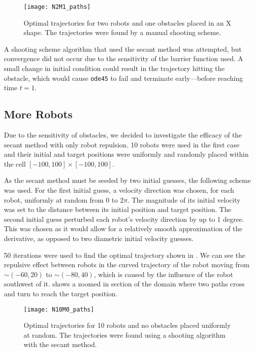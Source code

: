 \documentclass[11pt]{article}
\begin{document}
\begin{figure}
	\centering
	\texttt{[image: N2M1\_paths]}
	\caption{Optimal trajectories for two robots and one obstacles placed in an X shape. The trajectories were found by a manual shooting scheme.}
	\label{fig:n2m1-paths}
\end{figure}

A shooting scheme algorithm that used the secant method was attempted, but convergence did not occur due to the sensitivity of the barrier function used. A small change in initial condition could result in the trajectory hitting the obstacle, which would cause \texttt{ode45} to fail and terminate early---before reaching time \(t = 1\).

\subsection{More Robots}

Due to the sensitivity of obstacles, we decided to investigate the efficacy of the secant method with only robot repulsion. 10 robots were used in the first case and their initial and target positions were uniformly and randomly placed within the cell \([-100,100] \times [-100,100]\).

As the secant method must be seeded by two initial guesses, the following scheme was used. For the first initial guess, a velocity direction was chosen, for each robot, uniformly at random from \(0\) to \(2\pi\). The magnitude of its initial velocity was set to the distance between its initial position and target position. The second initial guess perturbed each robot's velocity direction by up to 1 degree. This was chosen as it would allow for a relatively smooth approximation of the derivative, as opposed to two diametric initial velocity guesses.

50 iterations were used to find the optimal trajectory shown in . We can see the repulsive effect between robots in the curved trajectory of the robot moving from \(\sim(-60,20)\) to \(\sim(-80,40)\), which is caused by the influence of the robot southwest of it.  shows a zoomed in section of the domain where two paths cross and turn to reach the target position.

\begin{figure}
	\centering
	\texttt{[image: N10M0\_paths]}
	\caption{Optimal trajectories for 10 robots and no obstacles placed uniformly at random. The trajectories were found using a shooting algorithm with the secant method.}
	\label{fig:n10m0-paths}
\end{figure}
\end{document}
